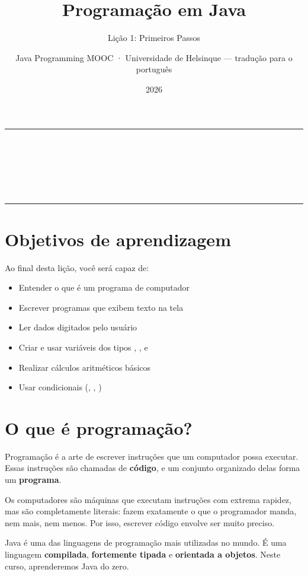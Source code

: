 \documentclass[11pt,a4paper]{article}
\title{Programação em Java}
\subtitle{Lição 1: Primeiros Passos}
\author{Java Programming MOOC · Universidade de Helsinque — tradução para o português}
\date{2026}
\makeatletter
\renewcommand{\maketitle}{%
  \begin{center}
    {\color{javaRule}\rule{\linewidth}{1pt}}\\[6pt]
    {\Huge\sffamily\bfseries\color{javaOrange} \@title}\\[6pt]
    \ifx\@subtitle\undefined\else
      {\Large\sffamily\color{javaDeep} \@subtitle}\\[4pt]
    \fi
    {\small\sffamily\color{gray} \@author}\\[2pt]
    {\small\sffamily\color{gray} \@date}\\[6pt]
    {\color{javaRule}\rule{\linewidth}{1pt}}
  \end{center}
  \vspace{1em}
}
\makeatother
\begin{document}
\maketitle
\tableofcontents
\vspace{1.5em}

\section{Objetivos de aprendizagem}

Ao final desta lição, você será capaz de:

\begin{itemize}
  \item Entender o que é um programa de computador
  \item Escrever programas que exibem texto na tela
  \item Ler dados digitados pelo usuário
  \item Criar e usar variáveis dos tipos , ,  e 
  \item Realizar cálculos aritméticos básicos
  \item Usar condicionais (, , )
\end{itemize}

\section{O que é programação?}

Programação é a arte de escrever instruções que um computador possa executar. Essas instruções são chamadas de \textbf{código}, e um conjunto organizado delas forma um \textbf{programa}.

Os computadores são máquinas que executam instruções com extrema rapidez, mas são completamente literais: fazem exatamente o que o programador manda, nem mais, nem menos. Por isso, escrever código envolve ser muito preciso.

Java é uma das linguagens de programação mais utilizadas no mundo. É uma linguagem \textbf{compilada}, \textbf{fortemente tipada} e \textbf{orientada a objetos}. Neste curso, aprenderemos Java do zero.

\end{document}
